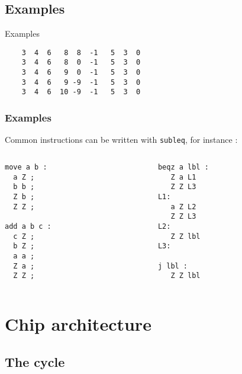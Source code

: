 \documentclass[slidestop]{beamer}
\begin{document}
\subsection{Examples}
\begin{frame}[fragile]{Examples}
  \begin{verbatim}
    3  4  6   8  8  -1   5  3  0
    3  4  6   8  0  -1   5  3  0
    3  4  6   9  0  -1   5  3  0
    3  4  6   9 -9  -1   5  3  0
    3  4  6  10 -9  -1   5  3  0
  \end{verbatim}
\end{frame}

\begin{frame}[fragile]
    \frametitle{Examples}
Common instructions can be written with \texttt{subleq}, for instance :

\begin{columns}[t]
    \begin{column}[T]{5cm}
\begin{lstlisting}
move a b :
  a Z ;
  b b ;
  Z b ;
  Z Z ;

add a b c :
  c Z ;
  b Z ;
  a a ;
  Z a ;
  Z Z ;
\end{lstlisting}
    \end{column}
\begin{column}[T]{5cm}
\begin{lstlisting}
beqz a lbl :
   Z a L1
   Z Z L3
L1:
   a Z L2
   Z Z L3
L2:
   Z Z lbl
L3:

j lbl :
   Z Z lbl
\end{lstlisting}
\end{column}
\end{columns}
\end{frame}

\section{Chip architecture}
\subsection{The cycle}
\end{document}
